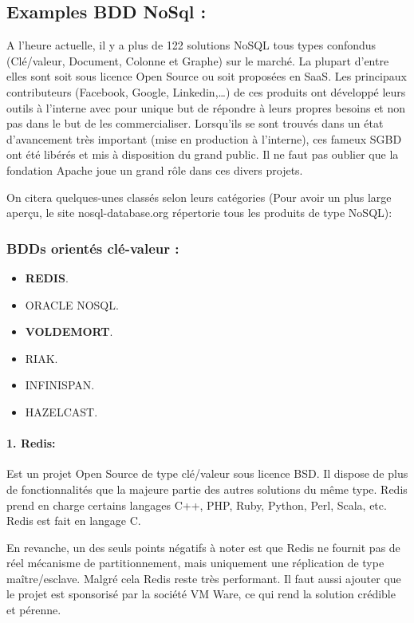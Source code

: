 \subsection{Examples BDD NoSql : }
A l’heure actuelle, il y a plus de 122 solutions NoSQL tous types confondus (Clé/valeur, Document, Colonne et Graphe) sur le marché. La plupart d’entre elles sont soit sous licence Open Source ou soit proposées en SaaS. Les principaux contributeurs (Facebook, Google, Linkedin,…) de ces produits ont développé leurs outils à l’interne avec pour unique but de répondre à leurs propres besoins et non pas dans le but de les commercialiser. Lorsqu’ils se sont trouvés dans un état d’avancement très important (mise en production à l’interne), ces fameux SGBD ont été libérés et mis à disposition du grand public. Il ne faut pas oublier que la fondation Apache joue un grand rôle dans ces divers projets.

On citera quelques-unes classés selon leurs catégories (Pour avoir un plus large aperçu, le site nosql-database.org répertorie tous les produits de type NoSQL):

\subsubsection{BDDs orientés clé-valeur :}

\begin{itemize}[label=\textbullet]
\item \textbf{REDIS}.
\item ORACLE NOSQL.
\item \textbf{VOLDEMORT}.
\item RIAK.
\item INFINISPAN.
\item HAZELCAST.
\end{itemize}

\paragraph{1. Redis:}
Est un projet Open Source de type clé/valeur sous licence BSD. Il dispose de plus de fonctionnalités que la majeure partie des autres solutions du même type. Redis prend en charge certains langages C++, PHP, Ruby,
Python, Perl, Scala, etc. Redis est fait en langage C.

En revanche, un des seuls points négatifs à noter est que Redis ne fournit pas de réel mécanisme de partitionnement, mais uniquement une réplication de type maître/esclave. Malgré cela Redis reste très performant. Il faut aussi ajouter que le projet est sponsorisé par la société VM Ware, ce qui rend la solution crédible et pérenne.

